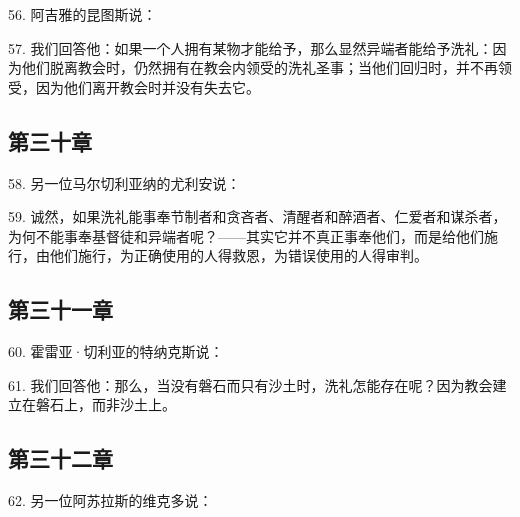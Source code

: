 56. 阿吉雅的昆图斯说：\par

57. 我们回答他：如果一个人拥有某物才能给予，那么显然异端者能给予洗礼：因为他们脱离教会时，仍然拥有在教会内领受的洗礼圣事；当他们回归时，并不再领受，因为他们离开教会时并没有失去它。\par


\subsection{第三十章}

58. 另一位马尔切利亚纳的尤利安说：\par

59. 诚然，如果洗礼能事奉节制者和贪吝者、清醒者和醉酒者、仁爱者和谋杀者，为何不能事奉基督徒和异端者呢？——其实它并不真正事奉他们，而是给他们施行，由他们施行，为正确使用的人得救恩，为错误使用的人得审判。\par


\subsection{第三十一章}

60. 霍雷亚·切利亚的特纳克斯说：\par

61. 我们回答他：那么，当没有磐石而只有沙土时，洗礼怎能存在呢？因为教会建立在磐石上，而非沙土上。\par


\subsection{第三十二章}

62. 另一位阿苏拉斯的维克多说：\par

